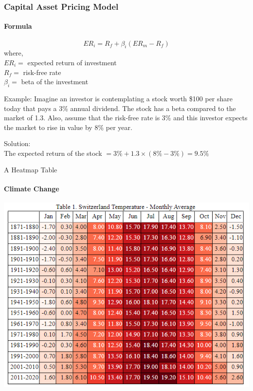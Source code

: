 \documentclass[10pt]{beamer}
\begin{document}
\begin{frame}
    \frametitle{Capital Asset Pricing Model}
    \framesubtitle{Formula}
    \begin{equation}
        ER_{i} = R_{f} + \beta_{i}(ER_{m}-R_{f})
    \end{equation}
    where, \\
    $ER_{i} =$ expected return of investment \\
    $R_{f} =$ risk-free rate \\
    $\beta_{i} =$ beta of the investment
    \vspace{5mm}

    Example: Imagine an investor is contemplating a stock worth \$100 per share today that pays a 3\% annual dividend. The stock has a beta compared to the market of 1.3. Also, assume that the risk-free rate is 3\% and this investor expects the market to rise in value by 8\% per year.\\
    
    \vspace{5mm}
    
    Solution: \\
    The expected return of the stock $ = 3\% + 1.3\times(8\% - 3\%) = 9.5\% $
\end{frame}

\begin{frame}{A Heatmap Table}
    \framesubtitle{Climate Change}
    \begin{minipage}{\textwidth}
        \centering
        \includegraphics[scale=0.55]{heatmap.png}
    \end{minipage} 
\end{frame}
\end{document}
